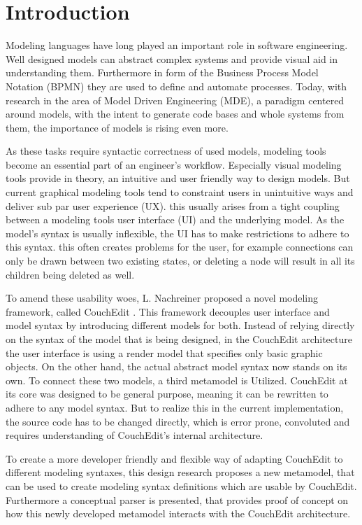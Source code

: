\chapter{Introduction}
\label{chap:introduction}


Modeling languages have long played an important role in software engineering. Well designed models can abstract complex systems and provide visual aid in understanding them. Furthermore in form of the Business Process Model Notation (BPMN) they are used to define and automate processes. Today, with research in the area of Model Driven Engineering (MDE), a paradigm centered around models, with the intent to generate code bases and whole systems from them, the importance of models is rising even more.

As these tasks require syntactic correctness of used models, modeling tools become an essential part of an engineer's workflow. Especially visual modeling tools provide in theory, an intuitive and user friendly way to design models. But current graphical modeling tools tend to constraint users in unintuitive ways and deliver sub par user experience (UX). this usually arises from a tight coupling between a modeling tools user interface (UI) and the underlying model. As the model's syntax is usually inflexible, the UI has to make restrictions to adhere to this syntax. this often creates problems for the user, for example connections can only be drawn between two existing states, or deleting a node will result in all its children being deleted as well.

To amend these usability woes, L. Nachreiner proposed a novel modeling framework, called CouchEdit \cite{nachreiner_couchedit_2020}. This framework decouples user interface and model syntax by introducing different models for both. Instead of relying directly on the syntax of the model that is being designed, in the CouchEdit architecture the user interface is using a render model that specifies only basic graphic objects. On the other hand, the actual abstract model syntax now stands on its own. To connect these two models, a third metamodel is Utilized. CouchEdit at its core was designed to be general purpose, meaning it can be rewritten to adhere to any model syntax. But to realize this in the current implementation, the source code has to be changed directly, which is error prone, convoluted and requires understanding of CouchEdit's internal architecture.

To create a more developer friendly and flexible way of adapting CouchEdit to different modeling syntaxes, this design research proposes a new metamodel, that can be used to create modeling syntax definitions which are usable by CouchEdit. Furthermore a conceptual parser is presented, that provides proof of concept on how this newly developed metamodel interacts with the CouchEdit architecture.

